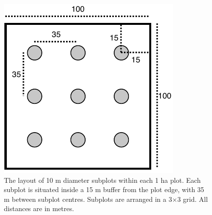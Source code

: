 \documentclass[11pt,a4paper]{article}
\begin{document}
\begin{figure}
	\includegraphics[width=0.5\linewidth]{plot}
	\caption{The layout of 10 m diameter subplots within each 1 ha plot. Each subplot is situated inside a 15 m buffer from the plot edge, with 35 m between subplot centres. Subplots are arranged in a 3$\times$3 grid. All distances are in metres.}
	\label{subplot_plot}
\end{figure}
\end{document}
